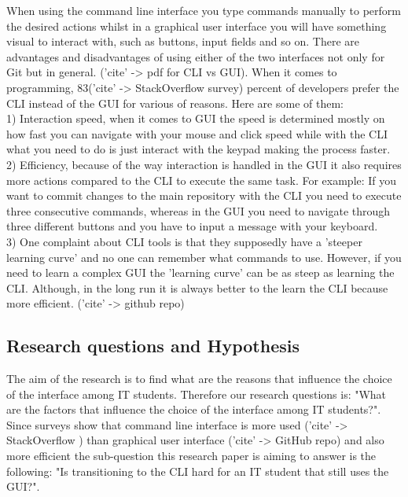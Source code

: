 \documentclass[]{report}
\begin{document}
	When using the command line interface you type commands manually to perform the desired actions whilst in a graphical user interface you will have something visual to interact with, such as buttons, input fields and so on. There are advantages and disadvantages of using either of the two interfaces not only for Git but in general. ('cite' -> pdf for CLI vs GUI). When it comes to programming, 83('cite' -> StackOverflow survey) percent of developers prefer the CLI instead of the GUI for various of reasons. Here are some of them: \\1) Interaction speed, when it comes to GUI the speed is determined mostly on how fast you can navigate with your mouse and click speed while with the CLI what you need to do is just interact with the keypad making the process faster. \\2) Efficiency, because of the way interaction is handled in the GUI it also requires more actions compared to the CLI to execute the same task. For example: If you want to commit changes to the main repository with the CLI you need to execute three consecutive commands, whereas in the GUI you need to navigate through three different buttons and you have to input a message with your keyboard. \\3) One complaint about CLI tools is that they supposedly have a 'steeper learning curve' and no one can remember what commands to use. However, if you need to learn a complex GUI the 'learning curve' can be as steep as learning the CLI. Although, in the long run it is always better to the learn the CLI because more efficient. ('cite' -> github repo)

	\subsection{Research questions and Hypothesis}
	The aim of the research is to find what are the reasons that influence the choice of the interface among IT students. Therefore our research questions is: "What are the factors that influence the choice of the interface among IT students?". Since surveys show that command line interface is more used ('cite' -> StackOverflow ) than graphical user interface ('cite' -> GitHub repo) and also more efficient the sub-question this research paper is aiming to answer is the following: "Is transitioning to the CLI hard for an IT student that still uses the GUI?".
	
\end{document}
